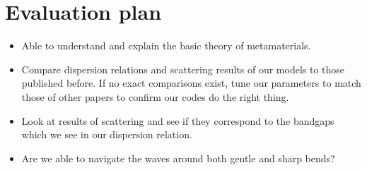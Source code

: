 \chapter{Evaluation plan}

\begin{itemize}
  \item Able to understand and explain the basic theory of metamaterials.
  \item Compare dispersion relations and scattering results of our models to
        those published before. If no exact comparisons exist, tune our
        parameters to match those of other papers to confirm our codes do the
        right thing.
  \item Look at results of scattering and see if they correspond to the
        bandgaps which we see in our dispersion relation.
  \item Are we able to navigate the waves around both gentle and sharp bends?
\end{itemize}

